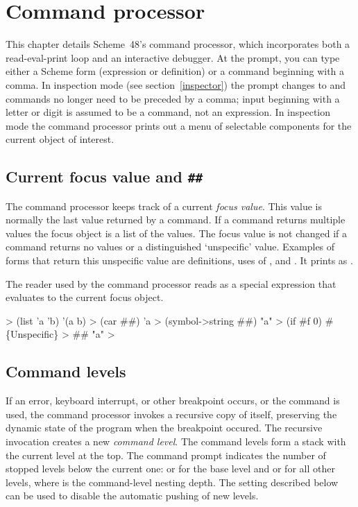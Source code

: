 \chapter{Command processor}
\label{chapter:command-processor}

This chapter details Scheme~48's command processor, which incorporates
 both a read-eval-print loop and an interactive debugger.
At the \code{>} prompt, you can type either a Scheme form
 (expression or definition) or a command beginning with a comma.
In
inspection mode (see section~\ref{inspector})
 the prompt changes to \code{:} and commands
 no longer need to be preceded by a comma; input beginning with
 a letter or digit is assumed to be a command, not an expression.
In inspection mode the command processor prints out a
 menu of selectable components for the current object of interest.

\section{Current focus value and {\tt \#\#}}

The command processor keeps track of a current {\em focus value}.
This value is normally the last value returned by a command.
If a command returns multiple values the focus object is a list of the
 values.
The focus value is not changed if a command returns no values or 
 a distinguished `unspecific' value.
Examples of forms that return this unspecific value are definitions,
 uses of , and .
It prints as .

The reader used by the command processor reads \code{\#\#} as a special
 expression that evaluates to the current focus object.
\begin{example}
> (list 'a 'b)
'(a b)
> (car ##)
'a
> (symbol->string ##)
"a"
> (if #f 0)
#\{Unspecific\}
> ##
"a"
> 
\end{example}

\section{Command levels}

If an error, keyboard interrupt, or other breakpoint occurs, or the
  command is used, the command
 processor invokes a recursive copy of itself, preserving the dynamic state of
 the program when the breakpoint occured.
The recursive invocation creates a new {\em command level}.
The command levels form a stack with the current level at the top.
The command prompt indicates the number of stopped levels below the
 current one: \code{>} or \code{:} for the
 base level and  or  for all other levels,
 where  is the command-level nesting depth.
The  setting
 described below can be used to disable the automatic pushing of new levels.


